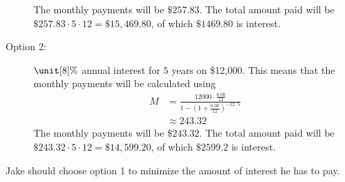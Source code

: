 \begin{problem}
\begin{subproblem}
\begin{shortsolution}
\begin{description}
         The monthly payments will be $\$257.83$. The total amount paid will be
         $\$257.83\cdot 5\cdot 12=\$15,469.80$, of which $\$1469.80$ is interest.
        \item[Option 2:] $\unit[8]{\%}$ annual interest for $5$ years on \$12,000.
         This means that the monthly payments will be calculated using
         \begin{align*}
          M & = \frac{12000\cdot \frac{0.08}{12}}{1-\left( 1+\frac{0.08}{12} \right)^{-12\cdot 5}}\\
            & \approx 243.32
         \end{align*}
         The monthly payments will be $\$243.32$. The total amount paid 
         will be $\$243.32\cdot 5\cdot 12 =\$14,599.20$, of which $\$2599.2$ is 
         interest.
         \end{description}
         Jake should choose option 1 to minimize the amount of interest 
         he has to pay.
        \end{shortsolution}
\end{subproblem}
\end{problem}

